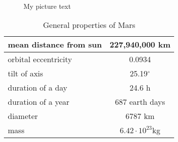 

\begin{figure}[htbp]
\begin{center}
\ifpdf
\else
\fi
\caption{My picture text}
\end{center}
\end{figure}


\begin{table}[htbp]
\begin{center}
\caption{General properties of Mars}\label{tab_mars}
\begin{tabular}{|l|c|}
\hline
mean distance from sun & 227,940,000 km\\ \hline
orbital eccentricity & 0.0934 \\ \hline
tilt of axis & 25.19$^\circ$ \\ \hline
duration of a day& 24.6 h \\ \hline
duration of a year& 687 earth days \\ \hline
diameter & 6787 km\\ \hline
mass & $6.42\cdot 10^{23}$kg \\ \hline
\end{tabular}
\end{center}
\end{table}

